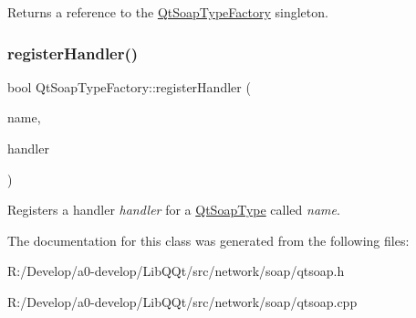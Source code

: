 Returns a reference to the \mbox{\hyperlink{class_qt_soap_type_factory}{Qt\+Soap\+Type\+Factory}} singleton. \mbox{\label{class_qt_soap_type_factory_a40b4ca8b260a678da380349a20b1c669}} 
\subsubsection{\texorpdfstring{register\+Handler()}{registerHandler()}}
{\footnotesize\ttfamily bool Qt\+Soap\+Type\+Factory\+::register\+Handler (\begin{DoxyParamCaption}\item[{const Q\+String \&}]{name,  }\item[{\mbox{\hyperlink{class_qt_soap_type_constructor_base}{Qt\+Soap\+Type\+Constructor\+Base}} $\ast$}]{handler }\end{DoxyParamCaption})}

Registers a handler {\itshape handler} for a \mbox{\hyperlink{class_qt_soap_type}{Qt\+Soap\+Type}} called {\itshape name}. 

The documentation for this class was generated from the following files\+:\begin{DoxyCompactItemize}
\item 
R\+:/\+Develop/a0-\/develop/\+Lib\+Q\+Qt/src/network/soap/qtsoap.\+h\item 
R\+:/\+Develop/a0-\/develop/\+Lib\+Q\+Qt/src/network/soap/qtsoap.\+cpp\end{DoxyCompactItemize}
